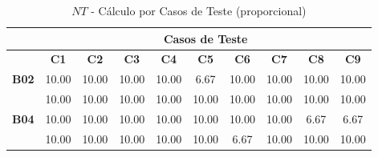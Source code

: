 \begin{table}[htbp]
	\centering
	\caption{$NT$ - Cálculo por Casos de Teste (proporcional)}
	\begin{tabular}{c|ccccccccc|}
		\cline{2-10}
		\rowcolor[HTML]{D0CECE} 
		\cellcolor[HTML]{F2F2F2}\textbf{} & \multicolumn{9}{c|}{\cellcolor[HTML]{D0CECE}\textbf{Casos de Teste}} \\ \hline
		\rowcolor[HTML]{D9D9D9} 
		\multicolumn{1}{|c|}{\cellcolor[HTML]{D0CECE}\textbf{Participante}} & \multicolumn{1}{c|}{\cellcolor[HTML]{D9D9D9}\textbf{C1}} & \multicolumn{1}{c|}{\cellcolor[HTML]{D9D9D9}\textbf{C2}} & \multicolumn{1}{c|}{\cellcolor[HTML]{D9D9D9}\textbf{C3}} & \multicolumn{1}{c|}{\cellcolor[HTML]{D9D9D9}\textbf{C4}} & \multicolumn{1}{c|}{\cellcolor[HTML]{D9D9D9}\textbf{C5}} & \multicolumn{1}{c|}{\cellcolor[HTML]{D9D9D9}\textbf{C6}} & \multicolumn{1}{c|}{\cellcolor[HTML]{D9D9D9}\textbf{C7}} & \multicolumn{1}{c|}{\cellcolor[HTML]{D9D9D9}\textbf{C8}} & \textbf{C9} \\ \hline
		\multicolumn{1}{|c|}{\textbf{B02}} & \multicolumn{1}{c|}{10.00} & \multicolumn{1}{c|}{10.00} & \multicolumn{1}{c|}{10.00} & \multicolumn{1}{c|}{10.00} & \multicolumn{1}{c|}{6.67} & \multicolumn{1}{c|}{10.00} & \multicolumn{1}{c|}{10.00} & \multicolumn{1}{c|}{10.00} & 10.00 \\ \hline
		\rowcolor[HTML]{F2F2F2} 
		\multicolumn{1}{|c|}{\cellcolor[HTML]{F2F2F2}\textbf{B03}} & \multicolumn{1}{c|}{\cellcolor[HTML]{F2F2F2}10.00} & \multicolumn{1}{c|}{\cellcolor[HTML]{F2F2F2}10.00} & \multicolumn{1}{c|}{\cellcolor[HTML]{F2F2F2}10.00} & \multicolumn{1}{c|}{\cellcolor[HTML]{F2F2F2}10.00} & \multicolumn{1}{c|}{\cellcolor[HTML]{F2F2F2}10.00} & \multicolumn{1}{c|}{\cellcolor[HTML]{F2F2F2}10.00} & \multicolumn{1}{c|}{\cellcolor[HTML]{F2F2F2}10.00} & \multicolumn{1}{c|}{\cellcolor[HTML]{F2F2F2}10.00} & 10.00 \\ \hline
		\multicolumn{1}{|c|}{\textbf{B04}} & \multicolumn{1}{c|}{10.00} & \multicolumn{1}{c|}{10.00} & \multicolumn{1}{c|}{10.00} & \multicolumn{1}{c|}{10.00} & \multicolumn{1}{c|}{10.00} & \multicolumn{1}{c|}{10.00} & \multicolumn{1}{c|}{10.00} & \multicolumn{1}{c|}{6.67} & 6.67 \\ \hline
		\rowcolor[HTML]{F2F2F2} 
		\multicolumn{1}{|c|}{\cellcolor[HTML]{F2F2F2}\textbf{B05}} & \multicolumn{1}{c|}{\cellcolor[HTML]{F2F2F2}10.00} & \multicolumn{1}{c|}{\cellcolor[HTML]{F2F2F2}10.00} & \multicolumn{1}{c|}{\cellcolor[HTML]{F2F2F2}10.00} & \multicolumn{1}{c|}{\cellcolor[HTML]{F2F2F2}10.00} & \multicolumn{1}{c|}{\cellcolor[HTML]{F2F2F2}10.00} & \multicolumn{1}{c|}{\cellcolor[HTML]{F2F2F2}6.67} & \multicolumn{1}{c|}{\cellcolor[HTML]{F2F2F2}10.00} & \multicolumn{1}{c|}{\cellcolor[HTML]{F2F2F2}10.00} & 10.00 \\ \hline

\end{tabular}
\end{table}
